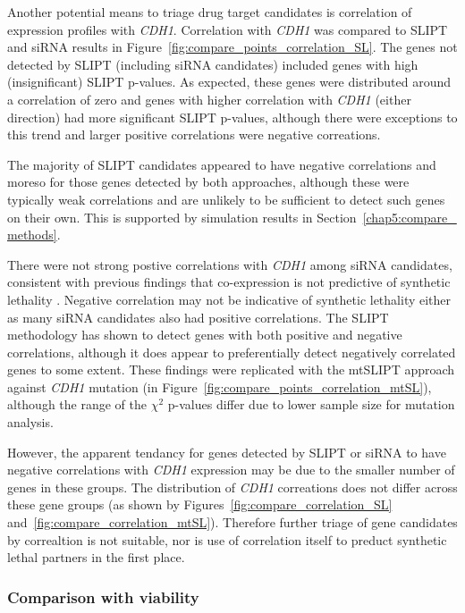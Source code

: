 Another potential means to triage drug target candidates is correlation of expression profiles with \textit{CDH1}. Correlation with \textit{CDH1} was compared to \gls{SLIPT} and \gls{siRNA} results in Figure~\ref{fig:compare_points_correlation_SL}. The genes not detected by \gls{SLIPT} (including \gls{siRNA} candidates) included genes with high (insignificant) \gls{SLIPT} p-values. As expected, these genes were distributed around a correlation of zero and genes with higher correlation with \textit{CDH1} (either direction) had more significant \gls{SLIPT} p-values, although there were exceptions to this trend and larger positive correlations were negative correations.

The majority of \gls{SLIPT} candidates appeared to have negative correlations and moreso for those genes detected by both approaches, although these were typically weak correlations and are unlikely to be sufficient to detect such genes on their own. This is supported by simulation results in Section~\ref{chap5:compare_ methods}.

There were not strong postive correlations with \textit{CDH1} among \gls{siRNA} candidates, consistent with previous findings that co-expression is not predictive of synthetic lethality \citep{Jerby2014, Lu2015}. Negative correlation may not be indicative of synthetic lethality either as many \gls{siRNA} candidates also had positive correlations. The \gls{SLIPT} methodology has shown to detect genes with both positive and negative correlations, although it does appear to preferentially detect negatively correlated genes to some extent. These findings were replicated with the mtSLIPT approach against \textit{CDH1} mutation (in Figure~\ref{fig:compare_points_correlation_mtSL}), although the range of the $\chi^2$ p-values differ due to lower sample size for mutation analysis.

However, the apparent tendancy for genes detected by \gls{SLIPT} or \gls{siRNA} to have negative correlations with \textit{CDH1} expression may be due to the smaller number of genes in these groups. The distribution of \textit{CDH1} correations does not differ across these gene groups (as shown by Figures~\ref{fig:compare_correlation_SL} and~\ref{fig:compare_correlation_mtSL}). Therefore further triage of gene candidates by correaltion is not suitable, nor is use of correlation itself to preduct synthetic lethal partners in the first place.

\FloatBarrier

\subsubsection{Comparison with viability} \label{chapt3:compare_viability}

